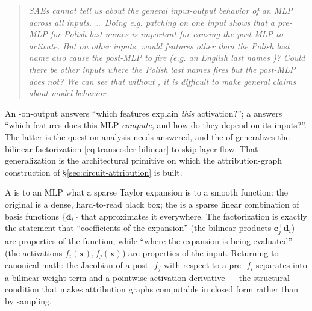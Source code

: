 \begin{quote}
\itshape
SAEs cannot tell us about the general input-output behavior of an MLP
across all inputs. \dots\ Doing e.g. patching on one input shows that a
pre-MLP  for Polish last names is important for causing the
post-MLP  to activate. But on other inputs, would features other
than the Polish last name  also cause the post-MLP  to
fire (e.g. an English last names )? Could there be other inputs
where the Polish last names  fires but the post-MLP  does
not? We can see that without , it is difficult to make
general claims about model
behavior.~\citep[\S 1]{dunefsky2024-transcoders}
\end{quote}

\noindent An -on-output answers ``which features explain
\emph{this} activation?''; a  answers ``which features does
this MLP \emph{compute}, and how do they depend on its inputs?''. The
latter is the question  analysis needs answered, and the
 of \citet{lindsey2025-circuit-tracing}
generalizes the bilinear factorization \eqref{eq:transcoder-bilinear}
to skip-layer  flow. That generalization is the architectural
primitive on which the attribution-graph construction of
\S\ref{sec:circuit-attribution} is built.

\begin{intuition}
A  is to an MLP what a sparse Taylor expansion is to a
smooth function: the original is a dense, hard-to-read black box; the
 is a sparse linear combination of basis functions
$\{\mathbf{d}_i\}$ that approximates it everywhere. The
 factorization is exactly the statement that
``coefficients of the expansion'' (the bilinear products
$\mathbf{e}_j^\top \mathbf{d}_i$) are properties of the function, while
``where the expansion is being evaluated'' (the activations
$f_i(\mathbf{x}), f_j(\mathbf{x})$) are properties of the input.
Returning to canonical math: the Jacobian of a post- 
$f_j$ with respect to a pre-  $f_i$ separates into a
bilinear weight term and a pointwise activation derivative ---
the structural condition that makes attribution graphs computable in
closed form rather than by sampling.
\end{intuition}

